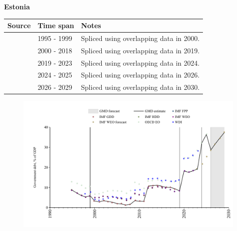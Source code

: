 \documentclass[12pt,a4paper,landscape]{article}
\begin{document}
\begin{adjustbox}{max totalsize={\paperwidth}{\paperheight},center}
\begin{minipage}[t][\textheight][t]{\textwidth}
\vspace*{0.5cm}
{}
\begin{center}
{\Large\bfseries Estonia}
\end{center}
\vspace{0.5cm}
\begin{table}[H]
\centering
\small
\begin{tabular}{|l|l|l|}
\hline
\textbf{Source} & \textbf{Time span} & \textbf{Notes} \\
\hline
\rowcolor{white}\cite{IMF_FPP}& 1995 - 1999 &Spliced using overlapping data in 2000.\\
\rowcolor{lightgray}\cite{IMF_GDD}& 2000 - 2018 &Spliced using overlapping data in 2019.\\
\rowcolor{white}\cite{IMF_FPP}& 2019 - 2023 &Spliced using overlapping data in 2024.\\
\rowcolor{lightgray}\cite{OECD_EO}& 2024 - 2025 &Spliced using overlapping data in 2026.\\
\rowcolor{white}\cite{IMF_WEO_forecast}& 2026 - 2029 &Spliced using overlapping data in 2030.\\
\hline
\end{tabular}
\end{table}
\begin{figure}[H]
\centering
\includegraphics[width=\textwidth,height=0.6\textheight,keepaspectratio]{graphs/EST_govdebt_GDP.pdf}
\end{figure}
\end{minipage}
\end{adjustbox}
\end{document}
